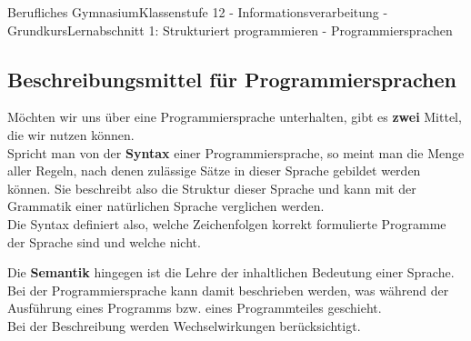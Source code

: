 \documentclass[11pt,oneside,openany,headings=optiontotoc,11pt,numbers=noenddot]{article}
\begin{document}
\begin{worksheet}{Berufliches Gymnasium}{Klassenstufe 12 - Informationsverarbeitung - Grundkurs}{Lernabschnitt 1: Strukturiert programmieren - Programmiersprachen}
		\subsection{Beschreibungsmittel für Programmiersprachen}
		Möchten wir uns über eine Programmiersprache unterhalten, gibt es \textbf{zwei} Mittel, die wir nutzen können.\\
		Spricht man von der \textbf{Syntax} einer Programmiersprache, so meint man die Menge aller Regeln, nach denen zulässige Sätze in dieser Sprache gebildet werden können. Sie beschreibt also die Struktur dieser Sprache und kann mit der Grammatik einer natürlichen Sprache verglichen werden.\\
		Die Syntax definiert also, welche Zeichenfolgen korrekt formulierte Programme der Sprache sind und welche nicht.\\
		\par\noindent
		Die \textbf{Semantik} hingegen ist die Lehre der inhaltlichen Bedeutung einer Sprache. Bei der Programmiersprache kann damit beschrieben werden, was während der Ausführung eines Programms bzw. eines Programmteiles geschieht.\\
		Bei der Beschreibung werden Wechselwirkungen berücksichtigt.

\end{worksheet}
\end{document}

